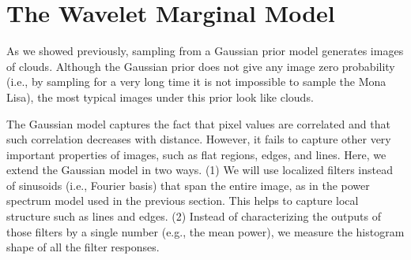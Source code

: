 %
%
%
%
%
%
%
%
%
%
%
%
%
%
\section{The Wavelet Marginal Model}

As we showed previously, sampling from a Gaussian prior model generates images of clouds. Although the Gaussian prior does not give any image  zero probability (i.e., by sampling for a very long time it is not impossible to sample the Mona Lisa), the most typical images under this prior look like clouds. 

The Gaussian model captures the fact that pixel values are correlated and that such correlation decreases with distance. However, it fails to capture other very important properties of images, such as flat regions, edges, and lines.  Here, we extend the Gaussian model in two ways.  (1) We will use localized filters instead of sinusoids (i.e., Fourier basis) that span the entire image, as in the power spectrum model used in the previous section.  This helps to capture local structure such as lines and edges. (2) Instead of characterizing the outputs of those filters by a single number (e.g., the mean power), we measure the histogram shape of all the filter responses. 


